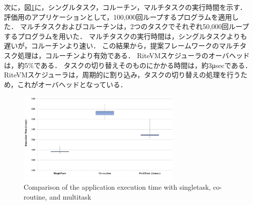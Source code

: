 \documentclass[submit]{ipsj_v2/UTF8/ipsj}
\begin{document}
次に，図\ref{fig:comparison_s_c_m}に，シングルタスク，コルーチン，マルチタスクの実行時間を示す．
評価用のアプリケーションとして，100,000回ループするプログラムを適用した．
マルチタスクおよびコルーチンは，2つのタスクでそれぞれ50,000回ループするプログラムを用いた．
マルチタスクの実行時間は，シングルタスクよりも遅いが，コルーチンより速い．
この結果から，提案フレームワークのマルチタスク処理は，コルーチンより有効である．
RiteVMスケジューラのオーバヘッドは，約5\%である．
タスクの切り替えそのものにかかる時間は，約3μsecである．
RiteVMスケジューラは，周期的に割り込み，タスクの切り替えの処理を行うため，これがオーバヘッドとなっている．



\begin{figure}[t]
    \centering
    \includegraphics[width=8cm,clip]{../EMSOFT2016/figure/comparison_s_c_m.pdf}
    \caption{Comparison of the application execution time with singletask, co-routine, and multitask}
    \label{fig:comparison_s_c_m}
\end{figure}
\end{document}
